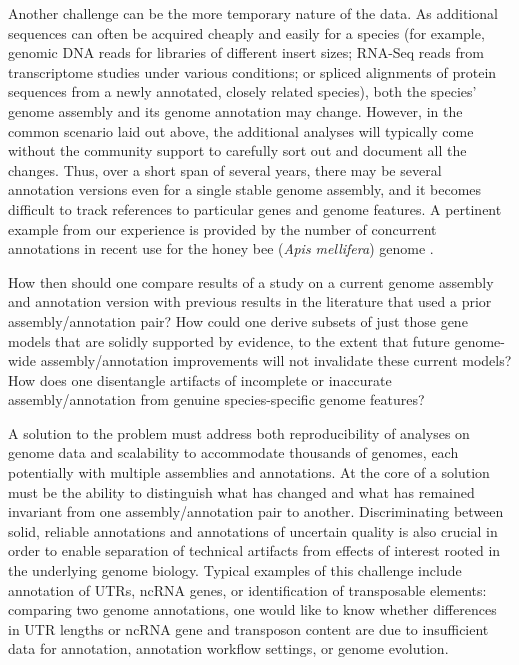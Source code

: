 Another challenge can be the more temporary nature of the data.
As additional sequences can often be acquired cheaply and easily for a species (for example, genomic DNA reads for libraries of different insert sizes; RNA-Seq reads from transcriptome studies under various conditions; or spliced alignments of protein sequences from a newly annotated, closely related species), both the species' genome assembly and its genome annotation may change.
However, in the common scenario laid out above, the additional analyses will typically come without the community support to carefully sort out and document all the changes.
Thus, over a short span of several years, there may be several annotation versions even for a single stable genome assembly, and it becomes difficult to track references to particular genes and genome features.
A pertinent example from our experience is provided by the number of concurrent annotations in recent use for the honey bee (\textit{Apis mellifera}) genome \cite{OGS1.0, OGS3.2, NCBIAm102}.

How then should one compare results of a study on a current genome assembly and annotation version with previous results in the literature that used a prior
assembly/annotation pair?
How could one derive subsets of just those gene models that are solidly supported by evidence, to the extent that future genome-wide assembly/annotation improvements will not invalidate these current models?
How does one disentangle artifacts of incomplete or inaccurate assembly/annotation from genuine species-specific genome features?

A solution to the problem must address both reproducibility of analyses on genome data and scalability to accommodate thousands of genomes, each potentially with multiple assemblies and annotations.
At the core of a solution must be the ability to distinguish what has changed and what has remained invariant from one assembly/annotation pair to another.
Discriminating between solid, reliable annotations and annotations of uncertain quality is also crucial in order to enable separation of technical artifacts from effects of interest rooted in the underlying genome biology.
Typical examples of this challenge include  annotation of UTRs, ncRNA genes, or identification of transposable elements: comparing two genome annotations, one would like to know whether differences in UTR lengths or ncRNA gene and transposon content are due to insufficient data for annotation, annotation workflow settings, or genome evolution.

